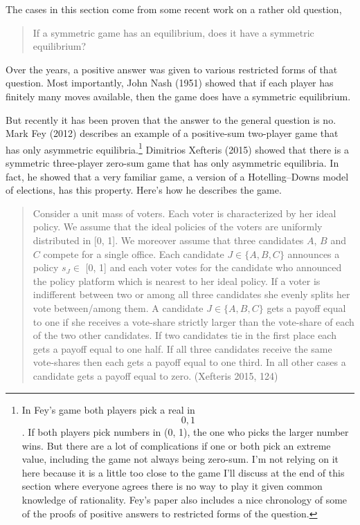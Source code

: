 \documentclass[
  11pt,
]{article}
\begin{document}
The cases in this section come from some recent work on a rather old question,

\begin{quote}
If a symmetric game has an equilibrium, does it have a symmetric equilibrium?
\end{quote}

Over the years, a positive answer was given to various restricted forms of that question. Most importantly, John Nash (1951) showed that if each player has finitely many moves available, then the game does have a symmetric equilibrium.

But recently it has been proven that the answer to the general question is no. Mark Fey (2012) describes an example of a positive-sum two-player game that has only asymmetric equilibria.\footnote{In Fey's game both players pick a real in \[0, 1\]. If both players pick numbers in (0, 1), the one who picks the larger number wins. But there are a lot of complications if one or both pick an extreme value, including the game not always being zero-sum. I'm not relying on it here because it is a little too close to the game I'll discuss at the end of this section where everyone agrees there is no way to play it given common knowledge of rationality. Fey's paper also includes a nice chronology of some of the proofs of positive answers to restricted forms of the question.} Dimitrios Xefteris (2015) showed that there is a symmetric three-player zero-sum game that has only asymmetric equilibria. In fact, he showed that a very familiar game, a version of a Hotelling--Downs model of elections, has this property. Here's how he describes the game.

\begin{quote}
Consider a unit mass of voters. Each voter is characterized by her ideal policy. We assume that the ideal policies of the voters are uniformly distributed in {[}0, 1{]}. We moreover assume that three candidates \(A\), \(B\) and \(C\) compete for a single office. Each candidate \(J \in \{A, B, C\}\) announces a policy \(s_J \in\) {[}0, 1{]} and each voter votes for the candidate who announced the policy platform which is nearest to her ideal policy. If a voter is indifferent between two or among all three candidates she evenly splits her vote between/among them. A candidate \(J \in \{A, B, C\}\) gets a payoff equal to one if she receives a vote-share strictly larger than the vote-share of each of the two other candidates. If two candidates tie in the first place each gets a payoff equal to one half. If all three candidates receive the same vote-shares then each gets a payoff equal to one third. In all other cases a candidate gets a payoff equal to zero. (Xefteris 2015, 124)
\end{quote}
\end{document}
